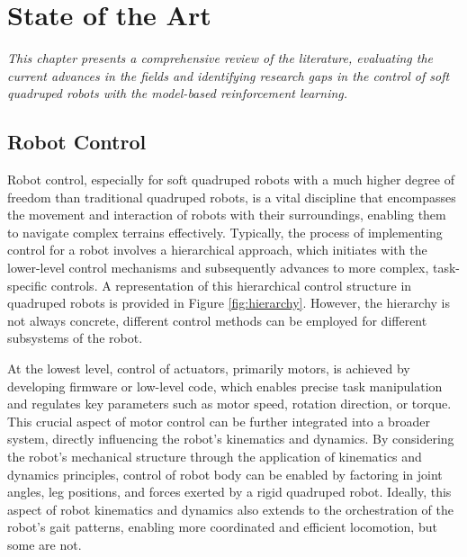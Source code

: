 \chapter{State of the Art}
\label{chap2}
\textit{This chapter presents a comprehensive review of the literature, evaluating the current advances in the fields and identifying research gaps in the control of soft quadruped robots with the model-based reinforcement learning.}

\section{Robot Control}
Robot control, especially for soft quadruped robots with a much higher degree of freedom than traditional quadruped robots, is a vital discipline that encompasses the movement and interaction of robots with their surroundings, enabling them to navigate complex terrains effectively\cite{biswalDevelopmentQuadrupedWalking2021}. Typically, the process of implementing control for a robot involves a hierarchical approach\cite{fazeliSeeFeelAct2019}, which initiates with the lower-level control mechanisms and subsequently advances to more complex, task-specific controls. A representation of this hierarchical control structure in quadruped robots is provided in Figure \ref{fig:hierarchy}. However, the hierarchy is not always concrete, different control methods can be employed for different subsystems of the robot.

At the lowest level, control of actuators, primarily motors, is achieved by developing firmware or low-level code\cite{yangMagneticActuationSystems2020}, which enables precise task manipulation and regulates key parameters such as motor speed, rotation direction, or torque. This crucial aspect of motor control can be further integrated into a broader system, directly influencing the robot's kinematics and dynamics\cite{dingNovelDynamicLocomotion2020}. By considering the robot's mechanical structure through the application of kinematics and dynamics principles, control of robot body can be enabled by factoring in joint angles, leg positions, and forces exerted by a rigid quadruped robot\cite{leeLearningQuadrupedalLocomotion2020}. Ideally, this aspect of robot kinematics and dynamics also extends to the orchestration of the robot's gait patterns, enabling more coordinated and efficient locomotion, but some are not\cite{dingNovelDynamicLocomotion2020}. 

